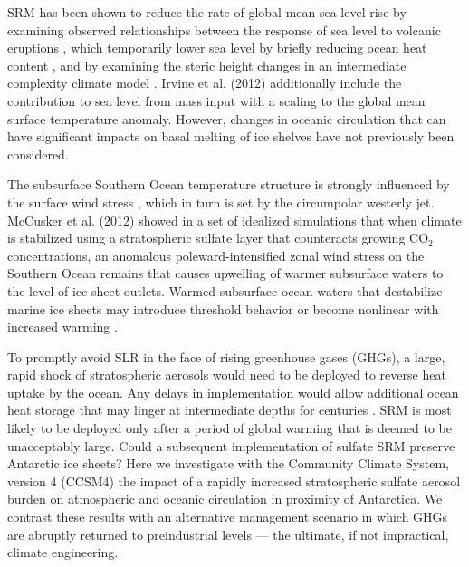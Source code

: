 \documentclass{nature}
\begin{document}
SRM has been shown to reduce the rate of global mean sea level rise by examining observed relationships between the response of sea level to volcanic eruptions \cite{moore10}, which temporarily lower sea level by briefly reducing ocean heat content \cite{church05,gleckler06}, and by examining the steric height changes in an intermediate complexity climate model \cite{irvine12}. Irvine et al. (2012) additionally include the contribution to sea level from mass input with a scaling to the global mean surface temperature anomaly. However, changes in oceanic circulation that can have significant impacts on basal melting of ice shelves \cite{steig13,joughin11,thoma08} have not previously been considered.

The subsurface Southern Ocean temperature structure is strongly influenced by the surface wind stress \cite{fyfe07,spence14}, which in turn is set by the circumpolar westerly jet. McCusker et al. (2012) showed in a set of idealized simulations that when climate is stabilized using a stratospheric sulfate layer that counteracts growing CO$_2$ concentrations, an anomalous poleward-intensified zonal wind stress on the Southern Ocean remains that causes upwelling of warmer subsurface waters to the level of ice sheet outlets. Warmed subsurface ocean waters that destabilize marine ice sheets may introduce threshold behavior \cite{notz09} or become nonlinear with increased warming \cite{joughin14}.

To promptly avoid SLR in the face of rising greenhouse gases (GHGs), a large, rapid shock of stratospheric aerosols would need to be deployed to reverse heat uptake by the ocean. Any delays in implementation would allow additional ocean heat storage that may linger at intermediate depths for centuries \cite{gillett11}. SRM is most likely to be deployed only after a period of global warming that is deemed to be unacceptably large. Could a subsequent implementation of sulfate SRM preserve Antarctic ice sheets? Here we investigate with the Community Climate System, version 4 (CCSM4) the impact of a rapidly increased stratospheric sulfate aerosol burden on atmospheric and oceanic circulation in proximity of Antarctica. We contrast these results with an alternative management scenario in which GHGs are abruptly returned to preindustrial levels --- the ultimate, if not impractical, climate engineering.  %
\end{document}
